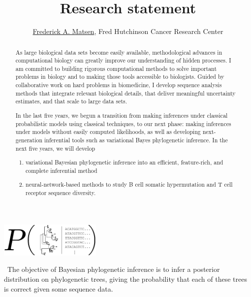 \documentclass[nobib]{tufte-handout}
\title{Research statement}
\author{\href{http://matsen.fredhutch.org/}{Frederick A. Matsen}, Fred Hutchinson Cancer Research Center}
\begin{document}
\maketitle

\begin{abstract}
\noindent
As large biological data sets become easily available, methodological advances in computational biology can greatly improve our understanding of hidden processes.
I am committed to building rigorous computational methods to solve important problems in biology and to making those tools accessible to biologists.
Guided by collaborative work on hard problems in biomedicine, I develop sequence analysis methods that integrate relevant biological details, that deliver meaningful uncertainty estimates, and that scale to large data sets.


\vspace{0.15cm}

\noindent
In the last five years, we begun a transition from making inferences under classical probabilistic models using classical techniques, to our next phase: making inferences under models without easily computed likelihoods, as well as developing next-generation inferential tools such as variational Bayes phylogenetic inference.
In the next five years, we will develop
\begin{enumerate}
\item variational Bayesian phylogenetic inference into an efficient, feature-rich, and complete inferential method
\item neural-network-based methods to study B cell somatic hypermutation and T cell receptor sequence diversity.
\end{enumerate}
\end{abstract}

\begin{marginfigure}[0.8in]%
  \includegraphics[width=1.95in]{bayesian_phylo}
  \caption{\
The objective of Bayesian phylogenetic inference is to infer a posterior distribution on phylogenetic trees, giving the probability that each of these trees is correct given some sequence data.
    }
  \label{FIGbayesPhylo}
\end{marginfigure}%


\vspace{0.3cm}
\end{document}
